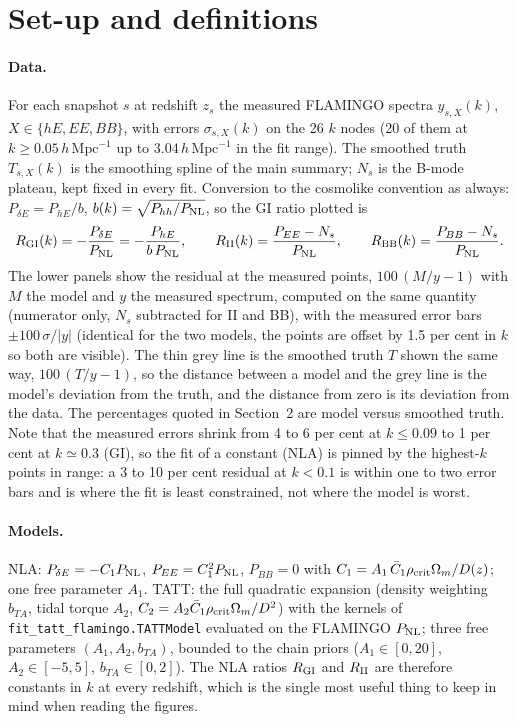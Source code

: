 \documentclass[11pt]{article}
\newcommand{\hmpc}{\,h\,\mathrm{Mpc}^{-1}}
\begin{document}
\section{Set-up and definitions}

\paragraph{Data.} For each snapshot $s$ at redshift $z_s$ the measured
FLAMINGO spectra $y_{s,X}(k)$, $X \in \{hE, EE, BB\}$, with errors
$\sigma_{s,X}(k)$ on the 26 $k$ nodes (20 of them at $k \ge 0.05\hmpc$ up to
$3.04\hmpc$ in the fit range). The smoothed truth $T_{s,X}(k)$ is the
smoothing spline of the main summary; $N_s$ is the B-mode plateau, kept fixed
in every fit. Conversion to the cosmolike convention as always:
$P_{\delta E} = P_{hE}/b$, $b(k) = \sqrt{P_{hh}/P_{\rm NL}}$, so the GI ratio
plotted is
\begin{equation}
  R_{\rm GI}(k) = -\frac{P_{\delta E}}{P_{\rm NL}} = -\frac{P_{hE}}{b\,P_{\rm NL}},
  \qquad
  R_{\rm II}(k) = \frac{P_{EE} - N_s}{P_{\rm NL}},
  \qquad
  R_{\rm BB}(k) = \frac{P_{BB} - N_s}{P_{\rm NL}} .
\end{equation}
The lower panels show the residual at the measured points,
$100\,(M/y - 1)$ with $M$ the model and $y$ the measured spectrum, computed on
the same quantity (numerator only, $N_s$ subtracted for II and BB), with the
measured error bars $\pm 100\,\sigma/|y|$ (identical for the two models, the
points are offset by 1.5 per cent in $k$ so both are visible). The thin grey
line is the smoothed truth $T$ shown the same way, $100\,(T/y - 1)$, so the
distance between a model and the grey line is the model's deviation from the
truth, and the distance from zero is its deviation from the data. The
percentages quoted in Section~2 are model versus smoothed truth. Note that
the measured errors shrink from 4 to 6 per cent at $k \le 0.09$ to 1 per cent
at $k \simeq 0.3$ (GI), so the fit of a constant (NLA) is pinned by the
highest-$k$ points in range: a 3 to 10 per cent residual at $k < 0.1$ is
within one to two error bars and is where the fit is least constrained, not
where the model is worst.

\paragraph{Models.} NLA: $P_{\delta E} = -C_1 P_{\rm NL}$, $P_{EE} = C_1^2 P_{\rm NL}$,
$P_{BB} = 0$ with $C_1 = A_1\,\bar C_1 \rho_{\rm crit}\Omega_m/D(z)$; one free
parameter $A_1$. TATT: the full quadratic expansion (density weighting $b_{TA}$,
tidal torque $A_2$, $C_2 = A_2 \bar C_1 \rho_{\rm crit}\Omega_m / D^2$) with
the kernels of \texttt{fit\_tatt\_flamingo.TATTModel} evaluated on the FLAMINGO
$P_{\rm NL}$; three free parameters $(A_1, A_2, b_{TA})$, bounded to the chain
priors ($A_1 \in [0, 20]$, $A_2 \in [-5, 5]$, $b_{TA} \in [0, 2]$). The NLA
ratios $R_{\rm GI}$ and $R_{\rm II}$ are therefore constants in $k$ at every
redshift, which is the single most useful thing to keep in mind when reading
the figures.
\end{document}

